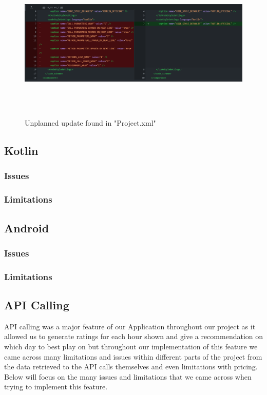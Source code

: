 \begin{figure}[H]
    \centering
    \includegraphics[width=16cm, height = 7.5cm]{img/Unplannedupdate.png}
    \caption{Unplanned update found in "Project.xml"}
    \label{fig:altas config}
\end{figure}

\subsection{Kotlin}
\subsubsection{Issues}
\subsubsection{Limitations}
\subsection{Android}
\subsubsection{Issues}
\subsubsection{Limitations}
\subsection{API Calling}
API calling was a major feature of our Application throughout our project as it allowed us to generate ratings for each hour shown and give a recommendation on which day to best play on but throughout our implementation of this feature we came across many limitations and issues within different parts of the project from the data retrieved to the API calls themselves and even limitations with pricing. Below will focus on the many issues and limitations that we came across when trying to implement this feature.


